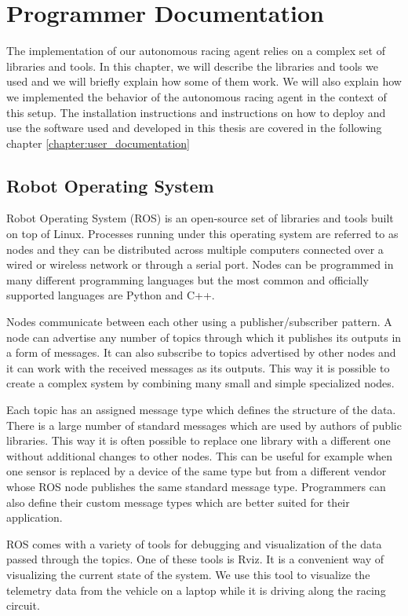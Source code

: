 \chapter{Programmer Documentation}

The implementation of our autonomous racing agent relies on a complex set of libraries and tools. In this chapter, we will describe the libraries and tools we used and we will briefly explain how some of them work. We will also explain how we implemented the behavior of the autonomous racing agent in the context of this setup. The installation instructions and instructions on how to deploy and use the software used and developed in this thesis are covered in the following chapter \ref{chapter:user_documentation}

\section{Robot Operating System}

Robot Operating System (ROS) is an open-source set of libraries and tools built on top of Linux. Processes running under this operating system are referred to as nodes and they can be distributed across multiple computers connected over a wired or wireless network or through a serial port. Nodes can be programmed in many different programming languages but the most common and officially supported languages are Python and C++.

Nodes communicate between each other using a publisher/subscriber pattern. A node can advertise any number of topics through which it publishes its outputs in a form of messages. It can also subscribe to topics advertised by other nodes and it can work with the received messages as its outputs. This way it is possible to create a complex system by combining many small and simple specialized nodes.

Each topic has an assigned message type which defines the structure of the data. There is a large number of standard messages which are used by authors of public libraries. This way it is often possible to replace one library with a different one without additional changes to other nodes. This can be useful for example when one sensor is replaced by a device of the same type but from a different vendor whose ROS node publishes the same standard message type. Programmers can also define their custom message types which are better suited for their application.

ROS comes with a variety of tools for debugging and visualization of the data passed through the topics. One of these tools is Rviz. It is a convenient way of visualizing the current state of the system. We use this tool to visualize the telemetry data from the vehicle on a laptop while it is driving along the racing circuit.

